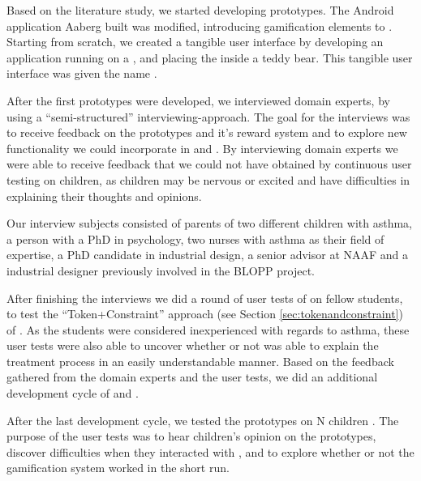 Based on the literature study, we started developing prototypes. The Android application Aaberg \etal{} built was modified, introducing gamification elements to \app{}. Starting from scratch, we created a tangible user interface by developing an application running on a \rpi{}, and placing the \rpi{} inside a teddy bear. This tangible user interface was given the name \ab{}.       

After the first prototypes were developed, we interviewed domain experts, by using a ``semi-structured'' interviewing-approach. The goal for the interviews was to receive feedback on the prototypes and it's reward system and to explore new functionality we could incorporate in \ab{} and \app{}. By interviewing domain experts we were able to receive feedback that we could not have obtained by continuous user testing on children, as children may be nervous or excited and have difficulties in explaining their thoughts and opinions.  

Our interview subjects consisted of parents of two different children with asthma, a person with a PhD in psychology, two nurses with asthma as their field of expertise, a PhD candidate in industrial design, a senior advisor at NAAF and a industrial designer previously involved in the BLOPP project. 

After finishing the interviews we did a round of user tests of \ab{} on fellow students, to test the ``Token+Constraint'' approach (see Section \ref{sec:tokenandconstraint}) of \ab{}. As the students were considered inexperienced with regards to asthma, these user tests were also able to uncover whether or not \ab{} was able to explain the treatment process in an easily understandable manner. Based on the feedback gathered from the domain experts and the user tests, we did an additional development cycle of \ab{} and \app{}.

After the last development cycle, we tested the prototypes on N children \iref{}. The purpose of the user tests was to hear children's opinion on the prototypes, discover difficulties when they interacted with \ab{}, and to explore whether or not the gamification system worked in the short run.  


